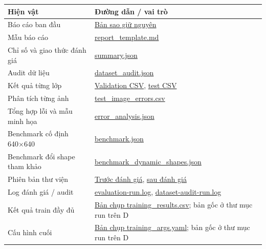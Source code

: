 \documentclass[
  vietnamese,
  12pt,
  a4paper,
]{article}
\newcounter{none} %
\begin{document}
{\def\LTcaptype{none} %
\begin{longtable}[]{@{}
  >{\raggedright\arraybackslash}p{}
  >{\raggedright\arraybackslash}p{}@{}}
\toprule\noalign{}
\begin{minipage}[b]{\linewidth}\raggedright
Hiện vật
\end{minipage} & \begin{minipage}[b]{\linewidth}\raggedright
Đường dẫn / vai trò
\end{minipage} \\
\midrule\noalign{}
\endhead
\bottomrule\noalign{}
\endlastfoot
Báo cáo ban đầu & \href{reports/Bao_cao_VietFood68_ban_dau.md}{Bản sao
giữ nguyên} \\
Mẫu báo cáo & \href{reports/report_template.md}{report\_template.md} \\
Chỉ số và giao thức đánh giá &
\href{reports/evaluation/summary.json}{summary.json} \\
Audit dữ liệu &
\href{reports/evaluation/dataset_audit.json}{dataset\_audit.json} \\
Kết quả từng lớp &
\href{reports/evaluation/val_per_class.csv}{Validation CSV},
\href{reports/evaluation/test_per_class.csv}{test CSV} \\
Phân tích từng ảnh &
\href{reports/evaluation/test_image_errors.csv}{test\_image\_errors.csv} \\
Tổng hợp lỗi và mẫu minh họa &
\href{reports/evaluation/error_analysis.json}{error\_analysis.json} \\
Benchmark cố định 640×640 &
\href{reports/evaluation/benchmark.json}{benchmark.json} \\
Benchmark đổi shape tham khảo &
\href{reports/evaluation/benchmark_dynamic_shapes.json}{benchmark\_dynamic\_shapes.json} \\
Phiên bản thư viện &
\href{reports/evaluation/environment-freeze.txt}{Trước đánh giá},
\href{reports/evaluation/environment-freeze-final.txt}{sau đánh giá} \\
Log đánh giá / audit &
\href{reports/evaluation-run.log}{evaluation-run.log},
\href{reports/dataset-audit-run.log}{dataset-audit-run.log} \\
Kết quả train đầy đủ &
\href{reports/evaluation/training_results.csv}{Bản chụp
training\_results.csv}; bản gốc ở thư mục run trên D \\
Cấu hình cuối & \href{reports/evaluation/training_args.yaml}{Bản chụp
training\_args.yaml}; bản gốc ở thư mục run trên D \\

\end{longtable}}
\end{document}
